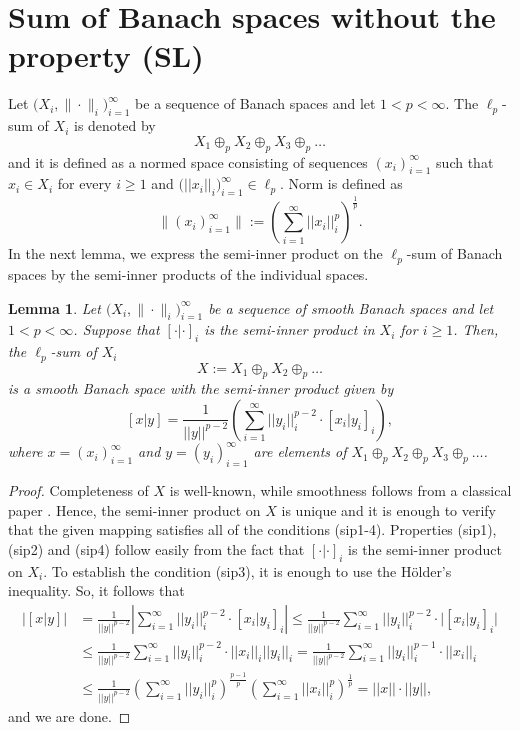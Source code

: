 \documentclass[12pt, reqno]{amsart}
\newtheorem{lemma}[theorem]{Lemma}
\theoremstyle{definition}
\theoremstyle{remark}
\numberwithin{equation}{section}
\newcommand{\sip}[2]{\left[#1|#2\right]}
\begin{document}
\section{Sum of Banach spaces without the property (SL)}
\label{sectionkonstrukcja}

Let $\big(X_i, \|\! \cdot\!\|_i\big)_{i=1}^{\infty}$ be a sequence of Banach spaces and let $1 < p < \infty$. The $\ell_p$-sum of $X_i$ is denoted by
$$X_1 \oplus_p X_2 \oplus_p X_3 \oplus_p \ldots$$
and it is defined as a normed space consisting of sequences $(x_i)_{i=1}^{\infty}$ such that $x_i \in X_i$ for every $i \geq 1$ and $\big(||x_i||_i\big)_{i=1}^{\infty} \in \ell_p$. Norm is defined as 
$$\big\|(x_i)_{i=1}^{\infty}\big\|:=\left ( \sum_{i=1}^{\infty} ||x_i||^p_i \right )^\frac{1}{p}.$$
In the next lemma, we express the semi-inner product on the $\ell_p$-sum of Banach spaces by the semi-inner products of the individual spaces.
\begin{lemma}
\label{sipsuma}
Let $\big(X_i, \|\! \cdot\!\|_i\big)_{i=1}^{\infty}$ be a sequence of smooth Banach spaces and let $1 < p < \infty$. Suppose that $\sip{\cdot}{\cdot}_i$ is the semi-inner product in $X_i$ for $i \geq 1$. Then, the $\ell_p$-sum of $X_i$
$$X:=X_1 \oplus_p X_2 \oplus_p \ldots$$
is a smooth Banach space with the semi-inner product given by
$$\sip{x}{y} = \frac{1}{||y||^{p-2}} \left ( \sum_{i=1}^{\infty} ||y_i||^{p-2}_i \cdot \sip{x_i}{y_i}_i \right ),$$ 
where $x=(x_i)_{i=1}^{\infty}$ and $y=(y_i)_{i=1}^{\infty}$ are elements of $X_1 \oplus_p X_2 \oplus_p X_3 \oplus_p \ldots$.
\end{lemma}

\begin{proof}
Completeness of $X$ is well-known, while smoothness follows from a classical paper \cite{zachariades}. Hence, the semi-inner product on $X$ is unique and it is enough to verify that the given mapping satisfies all of the conditions (sip1-4). Properties (sip1), (sip2) and (sip4) follow easily from the fact that $\sip{\cdot}{\cdot}_i$ is the semi-inner product on $X_i$. To establish the condition (sip3), it is enough to use the H\"older's inequality. So, it follows that
\begin{align*}
\big|\sip{x}{y}\big| &= \frac{1}{||y||^{p-2}} \left| \sum_{i=1}^{\infty} ||y_i||^{p-2}_i \cdot \sip{x_i}{y_i}_i \right| \leq \frac{1}{||y||^{p-2}} \sum_{i=1}^{\infty} ||y_i||^{p-2}_i \cdot \big|\sip{x_i}{y_i}_i \big|\\
&\leq\frac{1}{||y||^{p-2}} \sum_{i=1}^{\infty} ||y_i||^{p-2}_i \cdot ||x_i||_i||y_i||_i =\frac{1}{||y||^{p-2}} \sum_{i=1}^{\infty} ||y_i||^{p-1}_i \cdot ||x_i||_i\\
&\leq \frac{1}{||y||^{p-2}} \left ( \sum_{i=1}^{\infty} ||y_i||^p_i \right )^{\frac{p-1}{p}} \left ( \sum_{i=1}^{\infty} ||x_i||^p_i \right )^{\frac{1}{p}}=||x|| \cdot ||y||,
\end{align*}
and we are done.
\end{proof}
\end{document}
